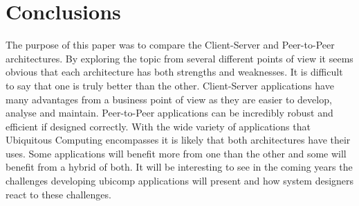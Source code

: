 \documentclass[11pt]{amsart}
\begin{document}
\section{Conclusions}

The purpose of this paper was to compare the Client-Server and Peer-to-Peer architectures. By exploring the topic from several different points of view it seems obvious that each architecture has both strengths and weaknesses. It is difficult to say that one is truly better than the other. Client-Server applications have many advantages from a business point of view as they are easier to develop, analyse and maintain. Peer-to-Peer applications can be incredibly robust and efficient if designed correctly. With the wide variety of applications that Ubiquitous Computing encompasses it is likely that both architectures have their uses. Some applications will benefit more from one than the other and some will benefit from a hybrid of both. It will be interesting to see in the coming years the challenges developing ubicomp applications will present and how system designers react to these challenges.


\end{document}
